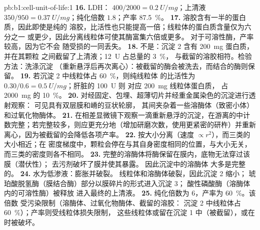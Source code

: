 \begin{solution}{pb:b1:cell-unit-of-life:1}
\textbf{16.} LDH： $400/2000 = \qty{0.2}{U/mg}$；上清液
$350/950 = \qty{0.37}{U/mg}$；纯化倍数 $1.8$；产率 \qty{87.5}{\%}。
\textbf{17.} 溶胶含有一半的蛋白质，因此即使是纯的
溶胶，比活性也只能提高一倍；线粒体的蛋白质含量仅为六分之一
或更少，因此分离线粒体可使其酶富集六倍或更多。
对于可溶性酶，产率较高，因为它不会
随受损的一同丢失。
\textbf{18.} 不是：沉淀 2 含有 \qty{200}{mg} 蛋白质，并在其颗粒
之间截留了上清液；\qty{12}{U} 占总量的 \qty{3}{\%}，
与截留的溶胶相符。检验方法：洗涤沉淀
（重新悬浮后再次离心）：被截留的酶会被洗去，而结合的酶则保留。
\textbf{19.} 若沉淀 2 中线粒体占 \qty{60}{\%}，则纯线粒体
的比活性为 $0.30/0.6 = \qty{0.5}{U/mg}$；肝脏的 \qty{100}{U} 则
对应 \qty{200}{mg} 线粒体蛋白质，
占 \qty{2000}{mg} 的 \qty{10}{\%}。
\textbf{20.} 对经固定、包埋、超薄切片并经重金属染色的沉淀进行透射观察：
可见具有双层膜和嵴的豆状轮廓，
其间夹杂着一些溶酶体（致密小体）和过氧化物酶体。
\textbf{21.} 在相差显微镜下观察一滴重新悬浮的沉淀，在游离的中计数完整；若完整较多，则应更充分地（增加研磨次数，使用更紧密的研杵）并重新离心，因为被截留的会降低各项产率。
\textbf{22.} 按大小分离（速度
$\propto r^2$），而三类的大小相近；在
密度梯度中，颗粒会停在与其自身密度相同的位置，与大小无关，
而三类的密度则各不相同。
\textbf{23.} 完整的溶酶体将酶保留在膜内，底物无法穿过该膜（潜伏性）；
去污剂破坏了膜并使其暴露。
因此沉淀中的溶酶体
大多是完整的。
\textbf{24.} 水为低渗液：膨胀并破裂。
线粒体和溶酶体破裂，因此沉淀 2 缩小；
琥珀酸脱氢酶（膜结合酶）部分以膜碎片的形式进入沉淀 3；
酸性磷酸酶（溶酶体内的可溶性酶）被释放
进入最终的上清液。
\textbf{25.} 纯化倍数为 $6$，产率为 \qty{60}{\%}。该倍数
受污染限制（溶酶体、过氧化物酶体、截留的溶胶：
沉淀 2 中线粒体占 \qty{60}{\%}）；产率则受线粒体损失限制，
这些线粒体或留在沉淀 1 中（被截留），或在时被破坏。
\end{solution}
